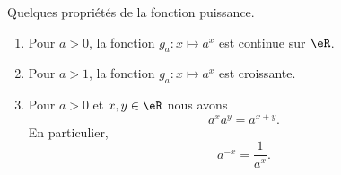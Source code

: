 \begin{proposition}      \label{PROPooVADRooLCLOzP}
	Quelques propriétés de la fonction puissance.
	\begin{enumerate}
		\item       \label{ITEMooQHYRooJIewyp}
		      Pour \( a>0\), la fonction \( g_a\colon x\mapsto a^x\) est continue sur \( \eR\).
		\item       \label{ITEMooIZBLooSGtWIp}
		      Pour \( a>1\), la fonction \( g_a\colon x\mapsto a^x\) est croissante.
		\item       \label{ITEMooSCJBooNVJZah}
		      Pour \( a>0\) et \( x,y\in \eR\) nous avons
		      \begin{equation}        \label{EQooEWIHooDRAQGR}
			      a^xa^y=a^{x+y}.
		      \end{equation}
		      En particulier,
		      \begin{equation}
			      a^{-x}=\frac{1}{ a^x }.
		      \end{equation}
	\end{enumerate}
\end{proposition}

